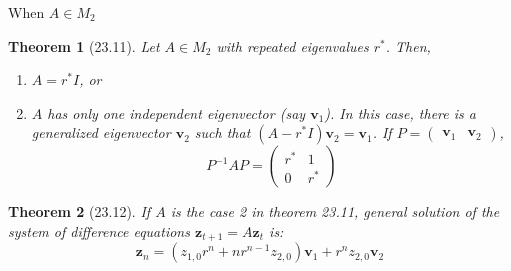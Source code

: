 \documentclass[final]{beamer}
\newtheorem{thm}{Theorem}
\newcommand{\bd}{\mathbf}
\begin{document}
\begin{frame}[t]{When $A\in M_2$}
	\begin{thm}
		[23.11] Let $A\in M_2$ with repeated eigenvalues $r^\ast$. Then, 
		\begin{enumerate}
			\item $A=r^\ast I$, or
			\item $A$ has only one independent eigenvector (say $\bd{v}_1$). In this case, there is a generalized eigenvector $\bd{v}_2$ such that $(A-r^\ast I)\bd{v}_2 = \bd{v}_1$. If $P=\begin{pmatrix}
				\bd{v}_1 & \bd{v}_2
			\end{pmatrix}$, \[
				P^{-1}AP = \begin{pmatrix}
					r^\ast & 1 \\
					0 & r^\ast
				\end{pmatrix}
			\]
		\end{enumerate}
	\end{thm}
	\begin{thm}
		[23.12] If $A$ is the case 2 in theorem 23.11, general solution of the system of difference equations $\bd{z}_{t+1}=A\bd{z}_t$ is: \[
			\bd{z}_n = (z_{1,0}r^n + nr^{n-1}z_{2,0})\bd{v}_1+r^n z_{2,0}\bd{v}_2
		\]
	\end{thm}
\end{frame}
\end{document}
